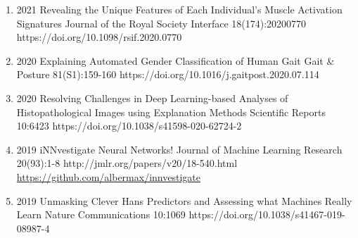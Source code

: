 \documentclass[10pt,a4paper]{article} %
\begin{document}
{\begin{enumerate}
    \item[] 
                        {2021}
                        {Revealing the Unique Features of Each Individual's Muscle Activation Signatures}
                        {Journal of the Royal Society Interface}
                        {18(174):20200770}
                        {https://doi.org/10.1098/rsif.2020.0770}

    \item[] 
                        {2020}
                        {Explaining Automated Gender Classification of Human Gait}
                        {Gait \& Posture}
                        {81(S1):159-160}
                        {https://doi.org/10.1016/j.gaitpost.2020.07.114}

    \item[] 
                        {2020}
                        {Resolving Challenges in Deep Learning-based Analyses of Histopathological Images using Explanation Methods}
                        {Scientific Reports}
                        {10:6423}
                        {https://doi.org/10.1038/s41598-020-62724-2}

    \item[] 
                        {2019}
                        {iNNvestigate Neural Networks!}
                        {Journal of Machine Learning Research}
                        {20(93):1-8}
                        {http://jmlr.org/papers/v20/18-540.html}
                        {\href{https://github.com/albermax/innvestigate}{https://github.com/albermax/innvestigate}}

    \item[] 
                        {2019}
                        {Unmasking Clever Hans Predictors and Assessing what Machines Really Learn}
                        {Nature Communications}
                        {10:1069}
                        {https://doi.org/10.1038/s41467-019-08987-4}


\end{enumerate}}
\end{document}
